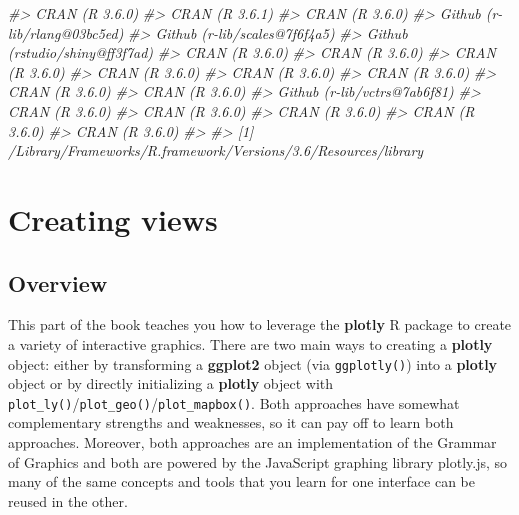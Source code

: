 \documentclass[
  12pt,
]{krantz}
\newenvironment{Shaded}{\begin{snugshade}}{\end{snugshade}}
\newcommand{\CommentTok}[1]{\textcolor[rgb]{0.56,0.35,0.01}{\textit{#1}}}
\begin{document}
\begin{Shaded}
\begin{Highlighting}[]
\CommentTok{#>  CRAN (R 3.6.0)                       }
\CommentTok{#>  CRAN (R 3.6.1)                       }
\CommentTok{#>  CRAN (R 3.6.0)                       }
\CommentTok{#>  Github (r-lib/rlang@03bc5ed)         }
\CommentTok{#>  Github (r-lib/scales@7f6f4a5)        }
\CommentTok{#>  Github (rstudio/shiny@ff3f7ad)       }
\CommentTok{#>  CRAN (R 3.6.0)                       }
\CommentTok{#>  CRAN (R 3.6.0)                       }
\CommentTok{#>  CRAN (R 3.6.0)                       }
\CommentTok{#>  CRAN (R 3.6.0)                       }
\CommentTok{#>  CRAN (R 3.6.0)                       }
\CommentTok{#>  CRAN (R 3.6.0)                       }
\CommentTok{#>  CRAN (R 3.6.0)                       }
\CommentTok{#>  CRAN (R 3.6.0)                       }
\CommentTok{#>  Github (r-lib/vctrs@7ab6f81)         }
\CommentTok{#>  CRAN (R 3.6.0)                       }
\CommentTok{#>  CRAN (R 3.6.0)                       }
\CommentTok{#>  CRAN (R 3.6.0)                       }
\CommentTok{#>  CRAN (R 3.6.0)                       }
\CommentTok{#>  CRAN (R 3.6.0)                       }
\CommentTok{#> }
\CommentTok{#> [1] /Library/Frameworks/R.framework/Versions/3.6/Resources/library}
\end{Highlighting}
\end{Shaded}

\hypertarget{part-creating-views}{%
\part{Creating views}\label{part-creating-views}}

\hypertarget{overview}{%
\chapter{Overview}\label{overview}}

This part of the book teaches you how to leverage the \textbf{plotly} R package to create a variety of interactive graphics. There are two main ways to creating a \textbf{plotly} object: either by transforming a \textbf{ggplot2} object (via \texttt{ggplotly()}) into a \textbf{plotly} object or by directly initializing a \textbf{plotly} object with \texttt{plot\_ly()}/\texttt{plot\_geo()}/\texttt{plot\_mapbox()}. Both approaches have somewhat complementary strengths and weaknesses, so it can pay off to learn both approaches. Moreover, both approaches are an implementation of the Grammar of Graphics and both are powered by the JavaScript graphing library plotly.js, so many of the same concepts and tools that you learn for one interface can be reused in the other.
\end{document}
